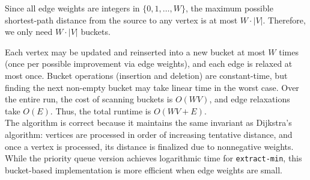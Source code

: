 \begin{customsolutionbox}
    Since all edge weights are integers in $\{0, 1, \ldots, W\}$, the maximum possible shortest-path distance from the source to any vertex is at most $W \cdot |V|$. Therefore, we only need $W \cdot |V|$ buckets.

    Each vertex may be updated and reinserted into a new bucket at most $W$ times (once per possible improvement via edge weights), 
    and each edge is relaxed at most once. Bucket operations (insertion and deletion) are constant-time, but finding the next non-empty 
    bucket may take linear time in the worst case. Over the entire run, the cost of scanning buckets is $O(WV)$, and edge relaxations take $O(E)$.
    Thus, the total runtime is $O(WV + E)$. \\

    The algorithm is correct because it maintains the same invariant as Dijkstra's algorithm: vertices are processed in order of increasing tentative 
    distance, and once a vertex is processed, its distance is finalized due to nonnegative weights. While the priority queue version achieves 
    logarithmic time for \texttt{extract-min}, this bucket-based implementation is more efficient when edge weights are small.

\end{customsolutionbox}
